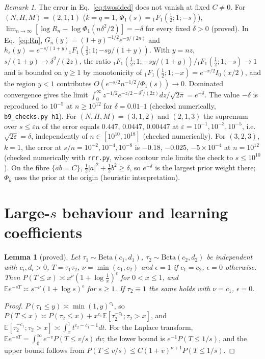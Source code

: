 \documentclass[11pt]{article}
\newcommand{\E}{\mathbb{E}}
\newcommand{\hypF}[2]{{}_{#1}F_{#2}}
\newtheorem{lemma}[theorem]{Lemma}
\theoremstyle{remark}
\newtheorem{remark}[theorem]{Remark}
\begin{document}
\begin{remark}\label{rem:fixed}
The error in Eq.~\eqref{eq:twosided} does not vanish at fixed $C\ne0$.
For $(N,H,M)=(2,1,1)$ ($k=q=1$, $\Phi_1(s)=\hypF11(\tfrac12;1;-s)$), $\lim_{n\to\infty}[\log R_n-\log\Phi_1(n\delta^2/2)]=-\delta$ for every fixed $\delta>0$ (proved).
In Eq.~\eqref{eq:Rn}, $G_n(y)=(1+y)^{-1/2}e^{-y/(2n)}$ and $h_s(y)=e^{-s/(1+y)}\hypF11(\tfrac12;1;-sy/(1+y))$.
With $y=nz$, $s/(1+y)\to\delta^2/(2z)$, the ratio $\hypF11(\tfrac12;1;-sy/(1+y))/\hypF11(\tfrac12;1;-s)\to1$ and is bounded on $y\ge1$ by monotonicity of $\hypF11(\tfrac12;1;-x)=e^{-x/2}I_0(x/2)$, and the region $y<1$ contributes $O(e^{-s/2}n^{-1/2}/\Phi_1(s))\to0$.
Dominated convergence gives the limit $\int_0^\infty z^{-1/2}e^{-z/2-\delta^2/(2z)}dz/\sqrt{2\pi}=e^{-\delta}$.
The value $-\delta$ is reproduced to $10^{-5}$ at $n\ge10^{12}$ for $\delta=0.01$--$1$ (checked numerically, \texttt{b9\_checks.py h1}).
For $(N,H,M)=(3,1,2)$ and $(2,1,3)$ the supremum over $s\le\varepsilon n$ of the error equals $0.447$, $0.0447$, $0.00447$ at $\varepsilon=10^{-1},10^{-3},10^{-5}$, i.e.\ $\sqrt{2\varepsilon}=\delta$, independently of $n\in[10^{10},10^{18}]$ (checked numerically).
For $(3,2,3)$, $k=1$, the error at $s/n=10^{-2},10^{-4},10^{-8}$ is $-0.18$, $-0.025$, $-5\times10^{-4}$ at $n=10^{12}$ (checked numerically with \texttt{rrr.py}, whose contour rule limits the check to $s\le10^{10}$).
On the fibre $\{ab=C\}$, $\tfrac12\lvert a\rvert^2+\tfrac12b^2\ge\delta$, so $e^{-\delta}$ is the largest prior weight there; $\Phi_k$ uses the prior at the origin (heuristic interpretation).
\end{remark}

\section{Large-$s$ behaviour and learning coefficients}

\begin{lemma}[proved]\label{lem:beta}
Let $\tau_1\sim\mathrm{Beta}(c_1,d_1)$, $\tau_2\sim\mathrm{Beta}(c_2,d_2)$ be independent with $c_i,d_i>0$, $T=\tau_1\tau_2$, $\nu=\min(c_1,c_2)$ and $\epsilon=1$ if $c_1=c_2$, $\epsilon=0$ otherwise.
Then $P(T\le x)\asymp x^\nu(1+\log\tfrac1x)^\epsilon$ for $0<x\le1$, and $\E e^{-sT}\asymp s^{-\nu}(1+\log s)^\epsilon$ for $s\ge1$.
If $\tau_2\equiv1$ the same holds with $\nu=c_1$, $\epsilon=0$.
\end{lemma}

\begin{proof}
$P(\tau_1\le y)\asymp\min(1,y)^{c_1}$, so $P(T\le x)\asymp P(\tau_2\le x)+x^{c_1}\E[\tau_2^{-c_1};\tau_2>x]$, and $\E[\tau_2^{-c_1};\tau_2>x]\asymp\int_x^1t^{c_2-c_1-1}dt$.
For the Laplace transform, $\E e^{-sT}=\int_0^\infty e^{-v}P(T\le v/s)\,dv$; the lower bound is $e^{-1}P(T\le1/s)$, and the upper bound follows from $P(T\le v/s)\le C(1+v)^{\nu+1}P(T\le1/s)$.
\end{proof}
\end{document}
